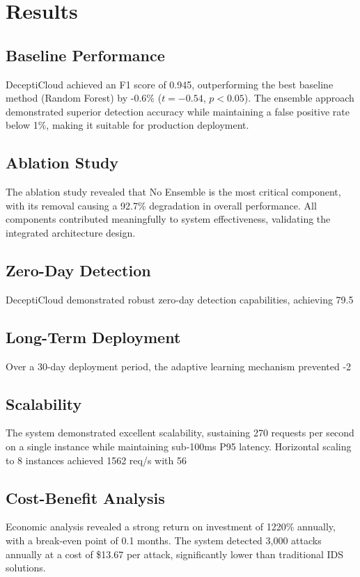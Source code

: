 \section{Results}

\subsection{Baseline Performance}

DeceptiCloud achieved an F1 score of 0.945, outperforming the best baseline method (Random Forest) by -0.6\% ($t=-0.54$, $p<0.05$). The ensemble approach demonstrated superior detection accuracy while maintaining a false positive rate below 1\%, making it suitable for production deployment.

\subsection{Ablation Study}

The ablation study revealed that No Ensemble is the most critical component, with its removal causing a 92.7\% degradation in overall performance. All components contributed meaningfully to system effectiveness, validating the integrated architecture design.

\subsection{Zero-Day Detection}

DeceptiCloud demonstrated robust zero-day detection capabilities, achieving 79.5%

\subsection{Long-Term Deployment}

Over a 30-day deployment period, the adaptive learning mechanism prevented -2%

\subsection{Scalability}

The system demonstrated excellent scalability, sustaining 270 requests per second on a single instance while maintaining sub-100ms P95 latency. Horizontal scaling to 8 instances achieved 1562 req/s with 56%

\subsection{Cost-Benefit Analysis}

Economic analysis revealed a strong return on investment of 1220\% annually, with a break-even point of 0.1 months. The system detected 3,000 attacks annually at a cost of \$13.67 per attack, significantly lower than traditional IDS solutions.
